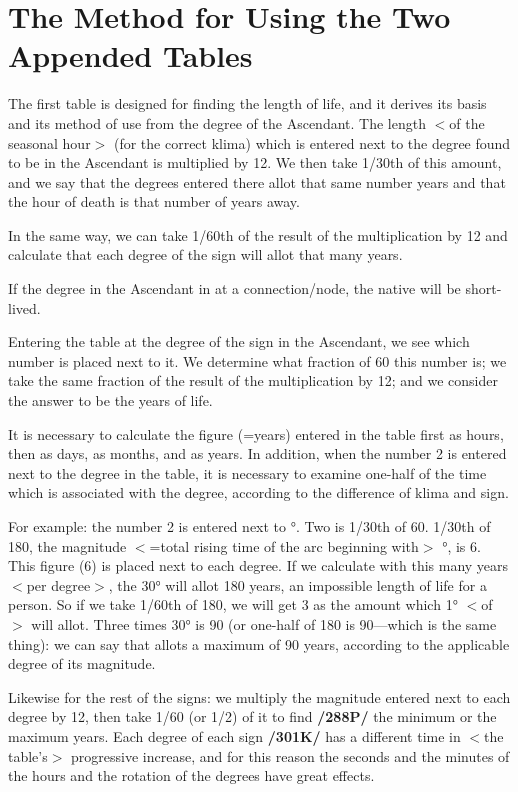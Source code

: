 \section{The Method for Using the Two Appended Tables}

The first table is designed for finding the length of life, and it derives its basis and its method of use from the degree of the Ascendant. The length $<$of the seasonal hour$>$ (for the correct klima) which is
entered next to the degree found to be in the Ascendant is multiplied by 12. We then take 1/30th of this amount, and we say that the degrees entered there allot that same number years and that the hour of death is that number of years away. 

In the same way, we can take 1/60th of the result of the multiplication by 12 and calculate that each degree of the sign will allot that many years. 

If the degree in the Ascendant in at a connection/node, the native will be short-lived.

Entering the table at the degree of the sign in the Ascendant, we see which number is placed next to it. We determine what fraction of 60 this number is; we take the same fraction of the result of the multiplication by 12; and we consider the answer to be the years of life. 

It is necessary to calculate the figure (=years) entered in the table first as hours, then as days, as months, and as years. In addition, when
the number 2 is entered next to the degree in the table, it is necessary to examine one-half of the time which is associated with the degree, according to the difference of klima and sign.

For example: the number 2 is entered next to \Libra\xspace 1°. Two is 1/30th of 60. 1/30th of 180, the magnitude $<$=total rising time of the arc beginning with$>$ \Libra\xspace 1°, is 6. This figure (6) is placed next to each degree. If we calculate with this many years $<$per degree$>$, the 30° will allot 180 years, an impossible length of life for a person. So if we take 1/60th of 180, we will get 3 as the amount which 1° $<$of \Libra$>$ will allot. Three times 30° is 90 (or one-half of 180 is 90—which is the same thing): we can say that \Libra\xspace allots a maximum of 90 years, according to the applicable degree of its magnitude.

Likewise for the rest of the signs: we multiply the magnitude entered next to each degree by 12, then take 1/60 (or 1/2) of it to find \textbf{/288P/} the minimum or the maximum years. Each degree of each sign
\textbf{/301K/} has a different time in $<$the table’s$>$ progressive increase, and for this reason the seconds and the minutes of the hours and the rotation of the degrees have great effects.

